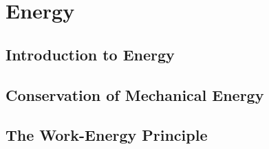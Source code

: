 \documentclass[../maths.tex]{subfiles}
\begin{document}
\chapter{Energy}
\section{Introduction to Energy}
\section{Conservation of Mechanical Energy}
\section{The Work-Energy Principle}
\end{document}
